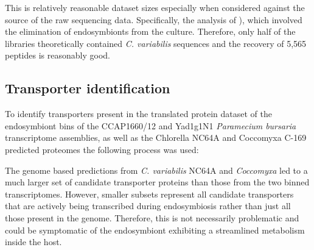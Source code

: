This is relatively reasonable dataset sizes especially
when considered against the source of the raw sequencing data.
Specifically, the analysis of \citep{Kodama2014}), which
involved the elimination of endosymbionts from the culture.
Therefore, only half of the libraries theoretically contained
\textit{C. variabilis} sequences and the recovery of 5,565 peptides
is reasonably good.


\subsection{Transporter identification}
To identify transporters present in the translated protein dataset of the 
endosymbiont bins of the CCAP1660/12 and Yad1g1N1 
\textit{Paramecium bursaria} transcriptome assemblies, as well as the Chlorella NC64A 
and Coccomyxa C-169 predicted proteomes the following process was used:

\begin{table}
    \centering

    \caption[Summary of Predicted Transporters Across Algal Sequences]{Summary
        of the sizes of the complete transporter complements identified in the 
        various algal sequence sets. The two genome based predicted proteomes
        generated much larger predicted sets of proteins (\textit{C. variabilis} NC64A
    and \textit{C. subellipsoidea} C-169).}
\end{table}

The genome based predictions from \textit{C. variabilis} NC64A and \textit{Coccomyxa}
led to a much larger set of candidate
transporter proteins than those from the two binned transcriptomes.
However, smaller subsets represent all 
candidate transporters
that are actively being transcribed during endosymbiosis rather than just
all those present in the genome. Therefore, this is not necessarily problematic
and could be symptomatic of the endosymbiont exhibiting a streamlined
metabolism inside the host.


